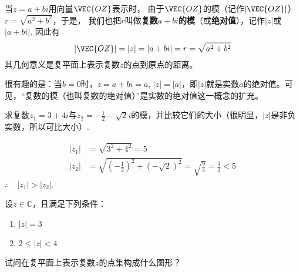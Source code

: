 当$z=a+bi$用向量$\VEC{OZ}$表示时，
由于$\VEC{OZ}$的模（记作$|\VEC{OZ}|$）$r=\sqrt{a^2+b^2}$，于是，
我们也把$r$叫做\textbf{复数$a+bi$的模}（或\textbf{绝对值}），记作$|z|$或
$|a+bi|$. 因此有
\[|\VEC{OZ}|=|z|=|a+bi|=r=\sqrt{a^2+b^2}\]
其几何意义是复平面上表示复数$z$的点到原点的距离。

很有趣的是：当$b=0$时，$z=a+bi=a$, $|z|=|a|$，即$|z|$就是实数$a$的绝对值。可见，“复数的模（也叫复数的绝对值）”是实数的绝对值这一概念的扩充。

\begin{example}
    求复数$z_1=3+4i$与$z_2=-\frac{1}{2}-\sqrt{2}i$的模，并比较它们的大小（很明显，$|z|$是非负实数，所以可比大小）.
\end{example}

\begin{solution}
\[\begin{split}
    |z_1|&=\sqrt{3^2+4^2}=5\\
|z_2|&=\sqrt{\left(-\frac{1}{2}\right)^2+\left(-\sqrt{2}\right)^2}=\sqrt{\frac{9}{4}}=\frac{3}{2}<5
\end{split}\]
$\therefore\quad |z_1|>|z_2|$.
\end{solution}

\noindent
\begin{minipage}{.5\textwidth}
    \begin{example}
    设$z\in\mathbb{C}$，且满足下列条件：
    \begin{enumerate}[(1)]
        \item $|z|=3$
        \item $2\le |z|<4$
    \end{enumerate}
试问在复平面上表示复数$z$的点集构成什么图形？
\end{example}
\end{minipage}\hfill
\begin{minipage}{.45\textwidth}
\centering
{}
\end{minipage}



